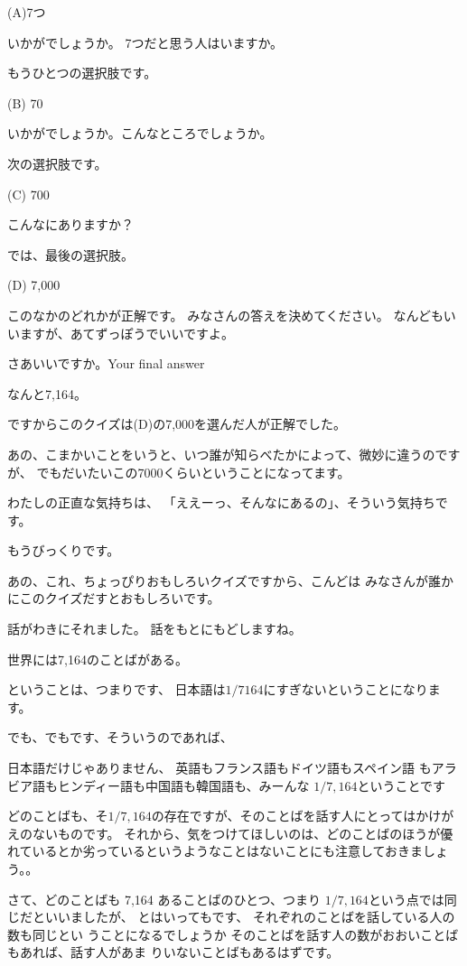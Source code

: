 \documentclass[12pt]{jlreq}
\begin{document}
(A)7つ

いかがでしょうか。
7つだと思う人はいますか。

もうひとつの選択肢です。

(B) 70

いかがでしょうか。こんなところでしょうか。

次の選択肢です。

(C) 700

こんなにありますか？

では、最後の選択肢。

(D) 7,000


このなかのどれかが正解です。
みなさんの答えを決めてください。
なんどもいいますが、あてずっぽうでいいですよ。

さあいいですか。Your final answer

なんと7,164。

ですからこのクイズは(D)の7,000を選んだ人が正解でした。

あの、こまかいことをいうと、いつ誰が知らべたかによって、微妙に違うのですが、
でもだいたいこの7000くらいということになってます。



わたしの正直な気持ちは、
「ええーっ、そんなにあるの」、そういう気持ちです。

もうびっくりです。

あの、これ、ちょっぴりおもしろいクイズですから、こんどは
みなさんが誰かにこのクイズだすとおもしろいです。

話がわきにそれました。
話をもとにもどしますね。



世界には7,164のことばがある。

ということは、つまりです、
日本語は${1}/{7164}$にすぎないということになります。

でも、でもです、そういうのであれば、

日本語だけじゃありません、
英語もフランス語もドイツ語もスペイン語
もアラビア語もヒンディー語も中国語も韓国語も、みーんな
$1/7,164$ということです

どのことばも、そ$1/7,164$の存在ですが、そのことばを話す人にとってはかけがえのないものです。
それから、気をつけてほしいのは、どのことばのほうが優れているとか劣っているというようなことはないことにも注意しておきましょう。。

\hrulefill

さて、どのことばも 7,164 あることばのひとつ、つまり
${1}/{7,164}$という点では同じだといいましたが、
とはいってもです、
それぞれのことばを話している人の数も同じとい
うことになるでしょうか
そのことばを話す人の数がおおいことばもあれば、話す人があま
りいないことばもあるはずです。
\end{document}

